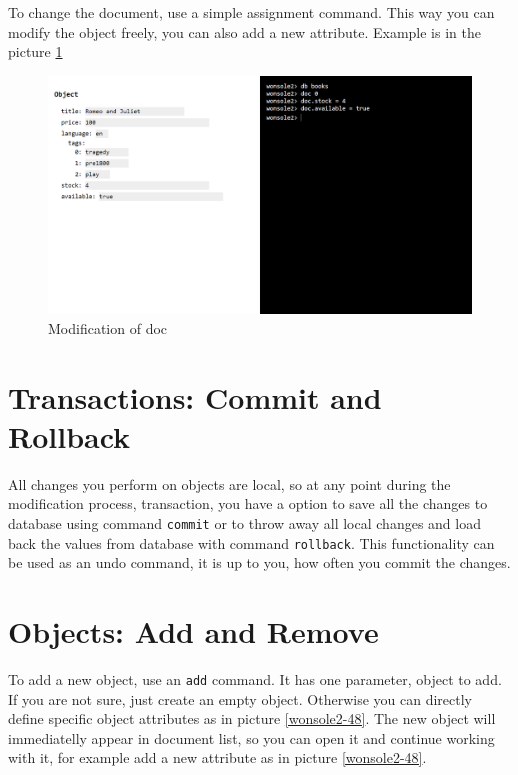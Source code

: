 To change the document, use a simple assignment command. This way you can modify
the object freely, you can also add a new attribute. Example is in the picture
\ref{wonsole2-38}


\begin{figure}
\centering
\includegraphics[width=\textwidth]{../../manual/screenshot/wonsole2/wonsole2-38.png}
\caption{Modification of doc}
\label{wonsole2-38}
\end{figure}



\section{Transactions: Commit and Rollback}
All changes you perform on objects are local, so at any point during the
modification process, transaction, you have a option to save all the changes to
database using command \verb|commit| or to throw away all local changes and load
back the values from database with command \verb|rollback|. This functionality
can be used as an undo command, it is up to you, how often you commit the
changes.


\section{Objects: Add and Remove}
To add a new object, use an \verb|add| command. It has one parameter, object to
add. If you are not sure, just create an empty object. Otherwise you can
directly define specific object attributes as in picture \ref{wonsole2-48}. The
new object will immediatelly appear in document list, so you can open
it and continue working with it, for example add a new attribute as in picture
\ref{wonsole2-48}.


